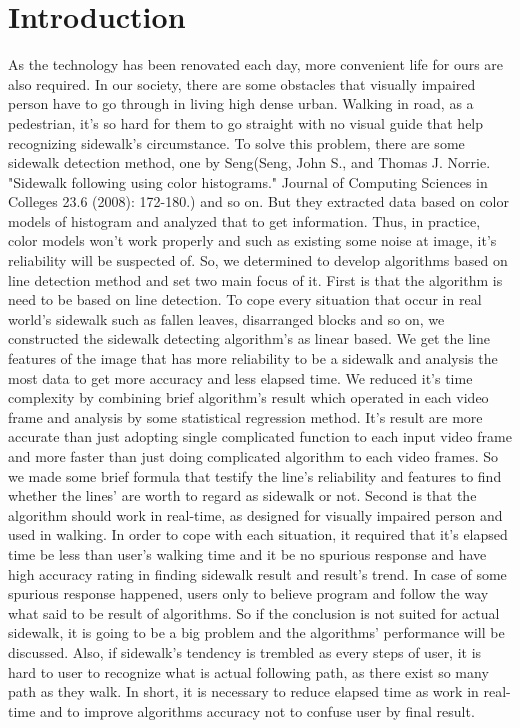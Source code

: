 \section{Introduction}
\label{sec:intro}
As the technology has been renovated each day, more convenient life for ours are also required. In our society, there are some obstacles that visually impaired person have to go through in living high dense urban. Walking in road, as a pedestrian, it's so hard for them to go straight with no visual guide that help recognizing sidewalk's circumstance. To solve this problem, there are some sidewalk detection method, one by Seng(Seng, John S., and Thomas J. Norrie. "Sidewalk following using color histograms." Journal of Computing Sciences in Colleges 23.6 (2008): 172-180.) and so on. But they extracted data based on color models of histogram and analyzed that to get information. Thus, in practice, color models won't work properly and such as existing some noise at image, it's reliability will be suspected of. So, we determined to develop algorithms based on line detection method and set two main focus of it. 
\newline First is that the algorithm is need to be based on line detection. To cope every situation that occur in real world's sidewalk such as fallen leaves, disarranged blocks and so on, we constructed the sidewalk detecting algorithm's as linear based. We get the line features of the image that has more reliability to be a sidewalk and analysis the most data to get more accuracy and less elapsed time. We reduced it's time complexity by combining brief algorithm's result which operated in each video frame and analysis by some statistical regression method. It's result are more accurate than just adopting single complicated function to each input video frame and more faster than just doing complicated algorithm to each video frames. So we made some brief formula that testify the line's reliability and features to find whether the lines' are worth to regard as sidewalk or not. 
\newline 
Second is that the algorithm should work in real-time, as designed for visually impaired person and used in walking. In order to cope with each situation, it required that it's elapsed time be less than user's walking time and it be no spurious response and have high accuracy rating in finding sidewalk result and result's trend. In case of some spurious response happened, users only to believe program and follow the way what said to be result of algorithms. So if the conclusion is not suited for actual sidewalk, it is going to be a big problem and the algorithms' performance will be discussed. Also, if sidewalk's tendency is trembled as every steps of user, it is hard to user to recognize what is actual following path, as there exist so many path as they walk. In short, it is necessary to reduce elapsed time as work in real-time and to improve algorithms accuracy not to confuse user by final result. 
